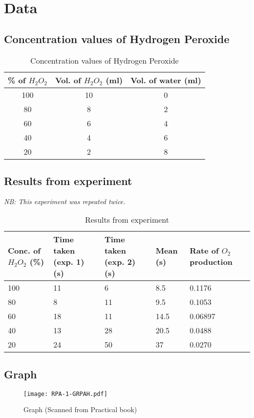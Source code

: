 \documentclass{thomasClass}
\begin{document}
\section{Data}
\subsection{Concentration values of Hydrogen Peroxide}
\begin{table}[H]
    \centering
    \begin{tabularx}{0.55\textwidth}{c|c|c}
        \% of $H_2O_2$ & Vol. of $H_2O_2$ (ml) & Vol. of water (ml) \\
        \hline
        100 & 10 & 0 \\
        80 & 8 & 2 \\
        60 & 6 & 4 \\
        40 & 4 & 6 \\
        20 & 2 & 8
    \end{tabularx}
    \caption{Concentration values of Hydrogen Peroxide}
    \label{tab:concentrationCalculations}
\end{table}
\subsection{Results from experiment}
\textit{NB: This experiment was repeated twice.}
\begin{table}[H]
    \centering
    \begin{tabularx}{0.8\textwidth}{X|X|X|X|X}
        Conc. of $H_2O_2$ (\%) & Time taken (exp. 1) (s) & Time taken (exp. 2) (s) & Mean (s) & Rate of $O_2$ production \\
        \hline
        100 & 11 & 6 & 8.5 & 0.1176 \\
        80 & 8 & 11 & 9.5 & 0.1053 \\
        60 & 18 & 11 & 14.5 & 0.06897 \\
        40 & 13 & 28 & 20.5 & 0.0488 \\
        20 & 24 & 50 & 37 & 0.0270
    \end{tabularx}
    \caption{Results from experiment}
    \label{tab:results}
\end{table}

\subsection{Graph}
\begin{figure} [H]
    \centering
    \texttt{[image: RPA-1-GRPAH.pdf]}
    \caption{Graph (Scanned from Practical book)}
\end{figure}
\end{document}
